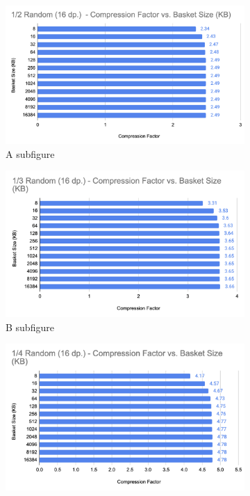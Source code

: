 \begin{figure}[h]
    \centering
    \begin{subfigure}{.5\textwidth}
        \centering
        \includegraphics[width=\textwidth]{content/toymodel_content/4.18/1_of_2.png}
        \caption{A subfigure}
        \label{fig:toymodel_418_compF_vs_basketsize_subA}
      \end{subfigure}%
      \begin{subfigure}{.5\textwidth}
        \centering
        \includegraphics[width=\textwidth]{content/toymodel_content/4.18/1_of_3.png}
        \caption{B subfigure}
        \label{fig:toymodel_418_compF_vs_basketsize_subB}
      \end{subfigure}%
      \linebreak
      \begin{subfigure}{.5\textwidth}
        \centering
        \includegraphics[width=\textwidth]{content/toymodel_content/4.18/1_of_4.png}

\end{subfigure}
\end{figure}
